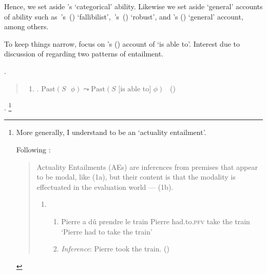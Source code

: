 \begin{note}
  Hence, we set aside \citeauthor{Austin:1961vz}'s `categorical' ability.
  Likewise we set aside `general' accounts of ability such as~\citeauthor{Carter:2021wd}'s~(\citeyear{Carter:2021wd}) `fallibilist',~\citeauthor{Kikkert:2022wp}'s~(\citeyear{Kikkert:2022wp}) `robust', and \citeauthor{Maier:2013vk}'s (\citeyear{Maier:2013vk}) `general' account, among others.

  To keep things narrow, focus on \citeauthor{Boylan:2020aa}'s (\citeyear{Boylan:2020aa}) account of `is able to'.
  Interest due to discussion of regarding two patterns of entailment.
\end{note}

\begin{note}
  \BoyPS{}.

  \begin{quote}
    \begin{enumerate}
    \item
      \label{Boylan:Past-Success}
      \BoyPS{}. \(\text{Past}(S\text{ }\phi) \leadsto \text{Past}(S\text{ [is able to] }\phi)\)%
      \mbox{ }\hfill\mbox{(\citeyear[\S1.1]{Boylan:2020aa})}
    \end{enumerate}
  \end{quote}
  \BoyPS{}.%
  \footnote{
    More generally, I understand \BoyPS{} to be an `actuality entailment'.

    Following \textcite{Alxatib:2019wf}:
    \begin{quote}
      Actuality Entailments (AEs) are inferences from premises that appear to be modal, like (1a), but their content is that the modality is effectuated in the evaluation world --- (1b).

      \begin{enumerate}[label=(\arabic*)]
      \item
        \begin{enumerate}[label=\alph*.]
        \item Pierre a dû \hspace{26pt} prendre le \hspace{3.5pt} train \newline
          Pierre had.to.\textsc{pfv} take \hspace{14pt} the train\newline
          \hspace{-4pt} ‘Pierre had to take the train'
        \item \emph{Inference}: Pierre took the train.%
          \mbox{}\hfill\mbox{(\citeyear[701]{Alxatib:2019wf})}
        \end{enumerate}
      \end{enumerate}
    \end{quote}

}
\end{note}
